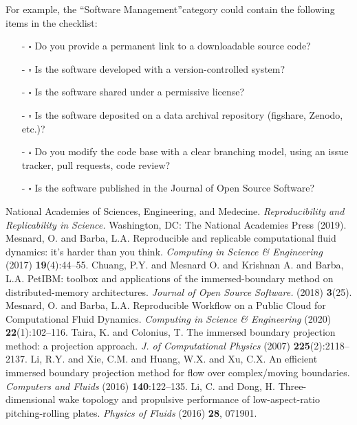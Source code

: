 \documentclass{parcfd}
\begin{document}
For example, the ``Software Management''category could contain the following items in the checklist:

\begin{itemize}
    \item[-] $\square$ Do you provide a permanent link to a downloadable source code?
    \item[-] $\square$ Is the software developed with a version-controlled system?
    \item[-] $\square$ Is the software shared under a permissive license?
    \item[-] $\square$ Is the software deposited on a data archival repository (figshare, Zenodo, etc.)?
    \item[-] $\square$ Do you modify the code base with a clear branching model, using an issue tracker, pull requests, code review?
    \item[-] $\square$ Is the software published in the Journal of Open Source Software?
\end{itemize}

\begin{thebibliography}{99}
     {National Academies of Sciences, Engineering, and Medecine.} \textit{Reproducibility and Replicability in Science.} Washington, DC: The National Academies Press (2019).
     Mesnard, O. and Barba, L.A. Reproducible and replicable computational fluid dynamics: it's harder than you think. \textit{Computing in Science \& Engineering} (2017) \textbf{19}(4):44--55.
     Chuang, P.Y. and Mesnard O. and Krishnan A. and Barba, L.A. PetIBM: toolbox and applications of the immersed-boundary method on distributed-memory architectures. \textit{Journal of Open Source Software.} (2018) \textbf{3}(25).
     Mesnard, O. and Barba, L.A. Reproducible Workflow on a Public Cloud for Computational Fluid Dynamics. \textit{Computing in Science \& Engineering} (2020) \textbf{22}(1):102--116.
     Taira, K. and Colonius, T. The immersed boundary projection method: a projection approach. \textit{J. of Computational Physics} (2007) \textbf{225}(2):2118--2137.
     Li, R.Y. and Xie, C.M. and Huang, W.X. and Xu, C.X. An efficient immersed boundary projection method for flow over complex/moving boundaries. \textit{Computers and Fluids} (2016) \textbf{140}:122--135.
     Li, C. and Dong, H. Three-dimensional wake topology and propulsive performance of low-aspect-ratio pitching-rolling plates. \textit{Physics of Fluids} (2016) \textbf{28}, 071901.
\end{thebibliography}
\end{document}
